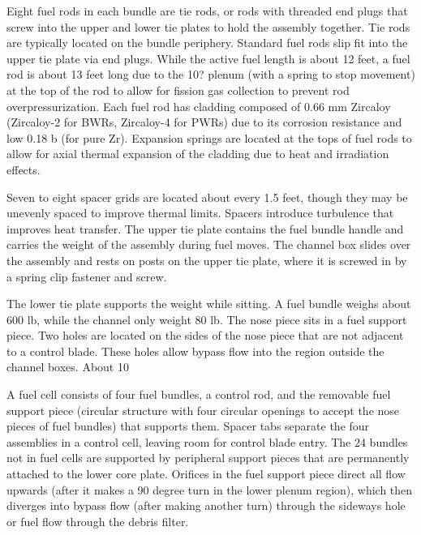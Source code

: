 \documentclass[10pt]{article}
\begin{document}
Eight fuel rods in each bundle are tie rods, or rods with threaded end plugs that screw into the upper and lower tie plates to hold the assembly together. Tie rods are typically located on the bundle periphery. Standard fuel rods slip fit into the upper tie plate via end plugs. While the active fuel length is about 12 feet, a fuel rod is about 13 feet long due to the 10? plenum (with a spring to stop movement) at the top of the rod to allow for fission gas collection to prevent rod overpressurization. Each fuel rod has cladding composed of 0.66 mm Zircaloy (Zircaloy-2 for BWRs, Zircaloy-4 for PWRs) due to its corrosion resistance and low  0.18 b (for pure Zr). Expansion springs are located at the tops of fuel rods to allow for axial thermal expansion of the cladding due to heat and irradiation effects. 

Seven to eight spacer grids are located about every 1.5 feet, though they may be unevenly spaced to improve thermal limits. Spacers introduce turbulence that improves heat transfer. The upper tie plate contains the fuel bundle handle and carries the weight of the assembly during fuel moves. The channel box slides over the assembly and rests on posts on the upper tie plate, where it is screwed in by a spring clip fastener and screw. 

The lower tie plate supports the weight while sitting. A fuel bundle weighs about 600 lb, while the channel only weight 80 lb. The nose piece sits in a fuel support piece. Two holes are located on the sides of the nose piece that are not adjacent to a control blade. These holes allow bypass flow into the region outside the channel boxes. About 10%

A fuel cell consists of four fuel bundles, a control rod, and the removable fuel support piece (circular structure with four circular openings to accept the nose pieces of fuel bundles) that supports them. Spacer tabs separate the four assemblies in a control cell, leaving room for control blade entry. The 24 bundles not in fuel cells are supported by peripheral support pieces that are permanently attached to the lower core plate. Orifices in the fuel support piece direct all flow upwards (after it makes a 90 degree turn in the lower plenum region), which then diverges into bypass flow (after making another turn) through the sideways hole or fuel flow through the debris filter. 
\end{document}
